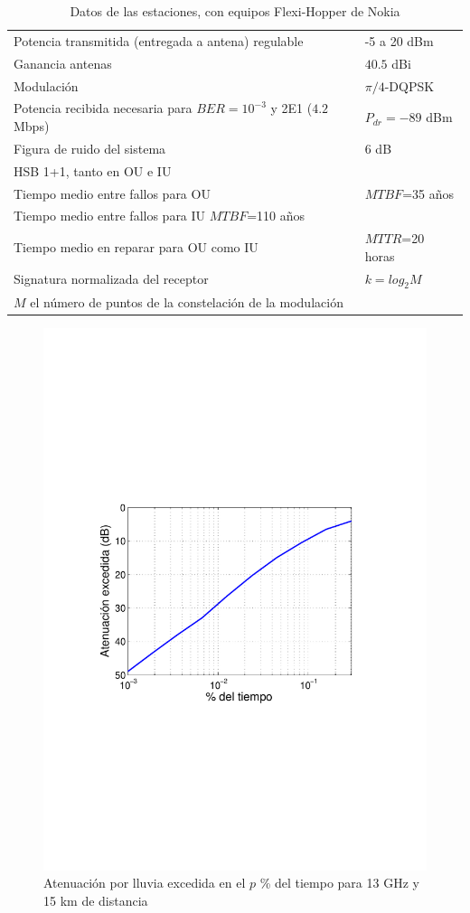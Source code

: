 \begin{table}[h]
\caption{Datos de las estaciones, con equipos Flexi-Hopper de Nokia}
\begin{center}
\begin{tabular}{p{8.5cm}p{2.5cm}}
 \hline
Potencia transmitida	(entregada a antena) regulable & -5 a 20 dBm	\\
Ganancia antenas & $40.5$ dBi\\	
Modulación & $\pi/4$-DQPSK\\
Potencia recibida necesaria para  $BER = 10^{-3}$ y 2E1 ($4.2$Mbps) & $P_{dr}=-89$ dBm\\
Figura de ruido del sistema & 6 dB\\
HSB 1+1, tanto en OU e IU &\\
Tiempo medio entre fallos para OU & $MTBF$=35 años \\
Tiempo medio entre fallos para IU $MTBF$=110 años \\
Tiempo medio en reparar para OU como IU & $MTTR$=20 horas\\
Signatura normalizada del receptor	& $k = log_2 M$ \\
 $M$ el número de puntos de la constelación de la modulación & \\
 \hline
\end{tabular}
\end{center}
\end{table}%
\begin{figure}[h]
\centering 
\includegraphics[width=8 cm]{CapituloProblemasLibroETSI/figuras/rain13GHz.pdf}
\caption{Atenuación por lluvia excedida en el $p$ \% del tiempo para 13 GHz y 15 km de distancia}%
\end{figure} 

